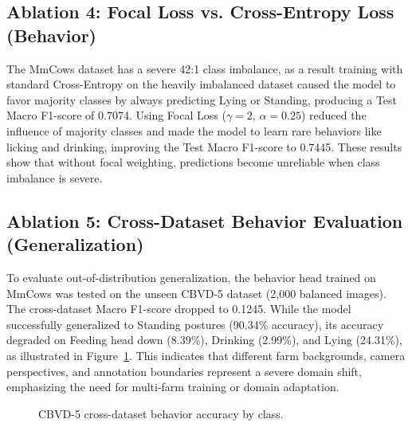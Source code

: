\subsection{Ablation 4: Focal Loss vs. Cross-Entropy Loss (Behavior)}
The MmCows dataset has a severe 42:1 class imbalance, as a result training with standard Cross-Entropy on the heavily imbalanced dataset caused the model to favor majority classes by always predicting Lying or Standing, producing a Test Macro F1-score of 0.7074. Using Focal Loss ($\gamma = 2$, $\alpha = 0.25$) reduced the influence of majority classes and made the model to learn rare behaviors like licking and drinking, improving the Test Macro F1-score to 0.7445. These results show that without focal weighting, predictions become unreliable when class imbalance is severe.

\subsection{Ablation 5: Cross-Dataset Behavior Evaluation (Generalization)}
To evaluate out-of-distribution generalization, the behavior head trained on MmCows was tested on the unseen CBVD-5 dataset (2,000 balanced images). The cross-dataset Macro F1-score dropped to 0.1245. While the model successfully generalized to Standing postures (90.34\% accuracy), its accuracy degraded on Feeding head down (8.39\%), Drinking (2.99\%), and Lying (24.31\%), as illustrated in Figure~\ref{fig:cbvd5_bar}. This indicates that different farm backgrounds, camera perspectives, and annotation boundaries represent a severe domain shift, emphasizing the need for multi-farm training or domain adaptation.

\begin{figure}[H]
\centering
{}
\caption{CBVD-5 cross-dataset behavior accuracy by class.}
\label{fig:cbvd5_bar}
\end{figure}

